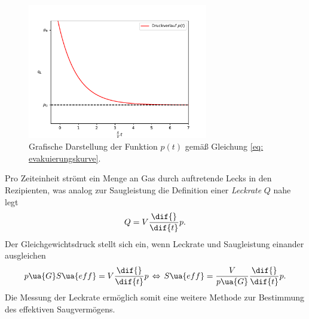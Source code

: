\begin{figure}[h]
  \centering
  \includegraphics[width = 0.7\textwidth]{theorie_plots/theo_p.pdf}
  \caption{Grafische Darstellung der Funktion $p(t)$ gemäß Gleichung \eqref{eq: evakuierungskurve}.}
  \label{fig: theo_p_t}
\end{figure}
\FloatBarrier
Pro Zeiteinheit
strömt ein Menge an Gas durch auftretende Lecks in den Rezipienten, was analog zur Saugleistung
die Definition einer \emph{Leckrate} $Q$ nahe legt
\begin{equation}
  Q = V \frac{\dif{}}{\dif{t}} p.
\end{equation}
Der Gleichgewichtsdruck stellt sich ein, wenn Leckrate und Saugleistung einander ausgleichen
\begin{equation}
  p\ua{G} S\ua{eff} =  V \frac{\dif{}}{\dif{t}} p \, \Leftrightarrow \,
  S\ua{eff} =  \frac{V}{p\ua{G}} \frac{\dif{}}{\dif{t}} p.
  \label{eq: saugvermögen_leckrate}
\end{equation}
Die Messung der Leckrate ermöglich somit eine weitere Methode zur Bestimmung des effektiven Saugvermögens.
